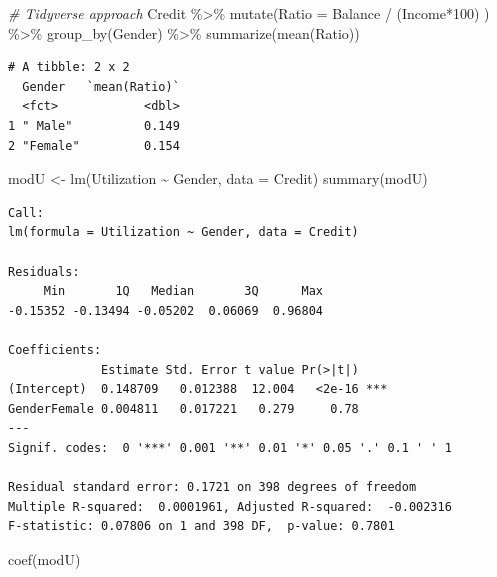 \documentclass[
]{article}
\newenvironment{Shaded}{\begin{snugshade}}{\end{snugshade}}
\newcommand{\AttributeTok}[1]{\textcolor[rgb]{0.77,0.63,0.00}{#1}}
\newcommand{\CommentTok}[1]{\textcolor[rgb]{0.56,0.35,0.01}{\textit{#1}}}
\newcommand{\DecValTok}[1]{\textcolor[rgb]{0.00,0.00,0.81}{#1}}
\newcommand{\FunctionTok}[1]{\textcolor[rgb]{0.00,0.00,0.00}{#1}}
\newcommand{\NormalTok}[1]{#1}
\newcommand{\OtherTok}[1]{\textcolor[rgb]{0.56,0.35,0.01}{#1}}
\newcommand{\SpecialCharTok}[1]{\textcolor[rgb]{0.00,0.00,0.00}{#1}}
\begin{document}
\begin{Shaded}
\begin{Highlighting}[]
\CommentTok{\# Tidyverse approach}
\NormalTok{Credit }\SpecialCharTok{\%\textgreater{}\%}
  \FunctionTok{mutate}\NormalTok{(}\AttributeTok{Ratio =}\NormalTok{ Balance }\SpecialCharTok{/}\NormalTok{ (Income}\SpecialCharTok{*}\DecValTok{100}\NormalTok{) ) }\SpecialCharTok{\%\textgreater{}\%}
  \FunctionTok{group\_by}\NormalTok{(Gender) }\SpecialCharTok{\%\textgreater{}\%}
  \FunctionTok{summarize}\NormalTok{(}\FunctionTok{mean}\NormalTok{(Ratio))}
\end{Highlighting}
\end{Shaded}

\begin{verbatim}
# A tibble: 2 x 2
  Gender   `mean(Ratio)`
  <fct>            <dbl>
1 " Male"          0.149
2 "Female"         0.154
\end{verbatim}

\begin{Shaded}
\begin{Highlighting}[]
\NormalTok{modU }\OtherTok{\textless{}{-}} \FunctionTok{lm}\NormalTok{(Utilization }\SpecialCharTok{\textasciitilde{}}\NormalTok{ Gender, }\AttributeTok{data =}\NormalTok{ Credit)}
\FunctionTok{summary}\NormalTok{(modU)}
\end{Highlighting}
\end{Shaded}

\begin{verbatim}
Call:
lm(formula = Utilization ~ Gender, data = Credit)

Residuals:
     Min       1Q   Median       3Q      Max 
-0.15352 -0.13494 -0.05202  0.06069  0.96804 

Coefficients:
             Estimate Std. Error t value Pr(>|t|)    
(Intercept)  0.148709   0.012388  12.004   <2e-16 ***
GenderFemale 0.004811   0.017221   0.279     0.78    
---
Signif. codes:  0 '***' 0.001 '**' 0.01 '*' 0.05 '.' 0.1 ' ' 1

Residual standard error: 0.1721 on 398 degrees of freedom
Multiple R-squared:  0.0001961, Adjusted R-squared:  -0.002316 
F-statistic: 0.07806 on 1 and 398 DF,  p-value: 0.7801
\end{verbatim}

\begin{Shaded}
\begin{Highlighting}[]
\FunctionTok{coef}\NormalTok{(modU)}
\end{Highlighting}
\end{Shaded}
\end{document}

